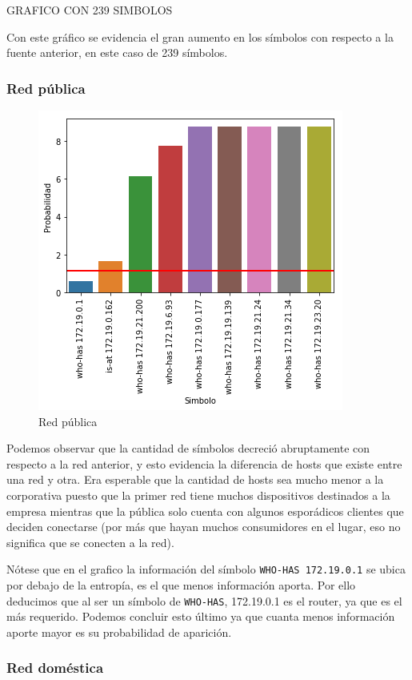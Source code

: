GRAFICO CON 239 SIMBOLOS

Con este gráfico se evidencia el gran aumento en los símbolos con respecto a la fuente anterior, en este caso de 239 símbolos.
\subsubsection{Red pública}

\begin{figure}[H]
	\centering
	\includegraphics[width=.5\linewidth]{imagenes/mac_hosts}
	\caption{Red pública}
\end{figure}

Podemos observar que la cantidad de símbolos decreció abruptamente con respecto a la red anterior, y esto evidencia la diferencia de hosts que existe entre una red y otra. Era esperable que la cantidad de hosts sea mucho menor a la corporativa puesto que la primer red tiene muchos dispositivos destinados a la empresa mientras que la pública solo cuenta con algunos esporádicos clientes que deciden conectarse (por más que hayan muchos consumidores en el lugar, eso no significa que se conecten a la red).

Nótese que en el grafico la información del símbolo \texttt{WHO-HAS 172.19.0.1} se ubica por debajo de la entropía, es el que menos información aporta. Por ello deducimos que al ser un símbolo de \texttt{WHO-HAS}, 172.19.0.1 es el router, ya que es el más requerido. Podemos concluir esto último ya que cuanta menos información aporte mayor es su probabilidad de aparición.

\subsubsection{Red doméstica}

